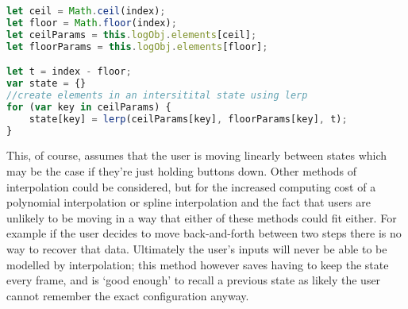 \begin{lstlisting}[language=javascript]
let ceil = Math.ceil(index);
let floor = Math.floor(index);
let ceilParams = this.logObj.elements[ceil];
let floorParams = this.logObj.elements[floor];

let t = index - floor;
var state = {}
//create elements in an intersitital state using lerp
for (var key in ceilParams) {
    state[key] = lerp(ceilParams[key], floorParams[key], t);
}
\end{lstlisting}

This, of course, assumes that the user is moving linearly between states which
may be the case if they're just holding buttons down. Other methods of
interpolation could be considered, but for the increased computing cost of a
polynomial interpolation or spline interpolation and the fact that users are
unlikely to be moving in a way that either of these methods could fit either.
For example if the user decides to move back-and-forth between two steps there
is no way to recover that data. Ultimately the user's inputs will never be able
to be modelled by interpolation; this method however saves having to keep the
state every frame, and is `good enough' to recall a previous state as likely the
user cannot remember the exact configuration anyway.

